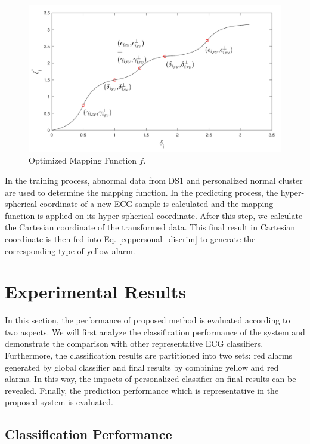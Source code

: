 {\begin{figure}[t]
\centering
\includegraphics[scale=.7]{Fig/optimized_mapping_f.pdf}
\caption{Optimized Mapping Function $f$.}
\label{fig:optimized_map}
\end{figure}

In the training process, abnormal data from DS1 and personalized normal cluster are used to determine the mapping function. In the predicting process, the hyper-spherical coordinate of a new ECG sample is calculated and the mapping function is applied on its hyper-spherical coordinate. After this step, we calculate the Cartesian coordinate of the transformed data. This final result in Cartesian coordinate is then fed into Eq. \ref{eq:personal_discrim} to generate the corresponding type of yellow alarm.



\section{Experimental Results}\label{sec:result_spatial}

In this section, the performance of proposed method is evaluated according to two aspects. We will first analyze the classification performance of the system and demonstrate the comparison with other representative ECG classifiers. Furthermore, the classification results are partitioned into two sets:  red alarms generated by global classifier and final results by combining yellow and red alarms. In this way, the impacts of personalized classifier on final results can be revealed. Finally, the prediction performance which is representative in the proposed system is evaluated.

\subsection{Classification Performance}

}
